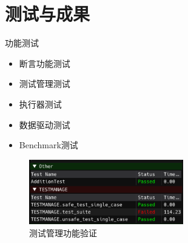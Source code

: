 \documentclass{beamer}
\begin{document}
\section{测试与成果}
\begin{frame}{功能测试}
    \begin{itemize}
        \item 断言功能测试
        \item 测试管理测试
        \item 执行器测试
        \item 数据驱动测试
        \item Benchmark测试
    \end{itemize}

    \begin{figure}
        \centering
        \includegraphics[width=0.6\textwidth]{img/manage.png}
        \caption{测试管理功能验证}
    \end{figure}
\end{frame}
\end{document}
